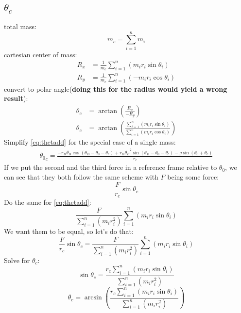 \documentclass[titlepage]{article}
\numberwithin{equation}{section}
\begin{document}
\subsection{$\theta_c$}
total mass:
\begin{equation}
m_c = \sum_{i=1}^{n}m_i
\end{equation}
cartesian center of mass:
\begin{align}
R_x &= \frac{1}{m_c} \sum_{i=1}^{n}(m_i r_i \sin \theta_i) \\
R_y &= \frac{1}{m_c} \sum_{i=1}^{n}(- m_i r_i \cos \theta_i) 
\end{align}
convert to polar angle(\textbf{doing this for the radius would yield a wrong result}):
\begin{align}
\theta_c &= \arctan{\left(\frac{R_x}{-R_y}\right)} \\
\theta_c &= \arctan{\left(\frac{
    \sum_{i=1}^{n}(m_i r_i \sin \theta_i)
} {
    \sum_{i=1}^{n}(m_i r_i \cos \theta_i)
}\right)}
\end{align}
Simplify \ref{eq:thetadd} for the special case of a single mass:
\begin{align}
\ddot{\theta_0}_c =
    \frac{
        - r_B \ddot{\theta_B} \cos{(\theta_B - \theta_0 - \theta_c)}
        + r_B \dot{\theta_B}^2 \sin{(\theta_B - \theta_0 - \theta_c)}
        - g \sin{(\theta_0 + \theta_c)}
    } {
        r_c
    } \label{eq:theta0cdd}
\end{align}
If we put the second and the third force in a reference frame relative to $\theta_0$, we can see that they both follow the same scheme with $F$ being some force:
\begin{equation}
\frac{F}{r_c} \sin \theta_c
\end{equation}
Do the same for \ref{eq:thetadd}:
\begin{equation}
\frac{F}{\sum_{i=1}^{n}(m_i r_i^2)} \sum_{i=1}^{n}(m_i r_i \sin \theta_i)
\end{equation}
We want them to be equal, so  let's do that:
\begin{equation}
\frac{F}{r_c} \sin \theta_c = 
    \frac{F}{\sum_{i=1}^{n}(m_i r_i^2)} \sum_{i=1}^{n}(m_i r_i \sin \theta_i)
\end{equation}
Solve for $\theta_c$:
\begin{equation}
\sin \theta_c = 
    \frac{
        r_c \sum_{i=1}^{n}(m_i r_i \sin \theta_i)
    } {
        \sum_{i=1}^{n}(m_i r_i^2)
    }
\end{equation}
\begin{equation}
\theta_c = 
\arcsin{\left(
    \frac{
        r_c \sum_{i=1}^{n}(m_i r_i \sin \theta_i)
    } {
        \sum_{i=1}^{n}(m_i r_i^2)
    }
\right)}
\end{equation}
\end{document}
